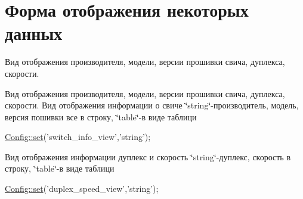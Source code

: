 \hypertarget{group__data__view}{\section{Форма отображения некоторых данных}
\label{group__data__view}
}


Вид отображения производителя, модели, версии прошивки свича, дуплекса, скорости.  


Вид отображения производителя, модели, версии прошивки свича, дуплекса, скорости. Вид отображения информации о свиче \char`\"{}string\char`\"{}-\/производитель, модель, версия пошивки все в строку, \char`\"{}table\char`\"{}-\/в виде таблици 
\begin{DoxyCode}
\hyperlink{class_config_aa485369b2925858d92e468d405bd0798}{Config::set}(\textcolor{stringliteral}{'switch\_info\_view'},\textcolor{stringliteral}{'string'});
\end{DoxyCode}
 Вид отображения информации дуплекс и скорость \char`\"{}string\char`\"{}-\/дуплекс, скорость в строку, \char`\"{}table\char`\"{}-\/в виде таблици 
\begin{DoxyCode}
\hyperlink{class_config_aa485369b2925858d92e468d405bd0798}{Config::set}(\textcolor{stringliteral}{'duplex\_speed\_view'},\textcolor{stringliteral}{'string'});
\end{DoxyCode}
 